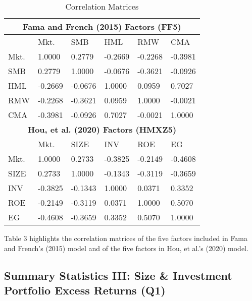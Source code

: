 \documentclass[11pt, english]{article}
\begin{document}
\begin{table}[h]
	\scriptsize
	\renewcommand{\arraystretch}{1.25}
\begin{center}                  
\begin{tabular}{ p{1.5cm} | p{1.5cm} p{1.5cm} p{1.5cm} p{1.5cm} p{1.5cm} }
        \hline
        \hline
        \multicolumn{6}{c}{\textbf{Fama and French (2015) Factors (FF5)}}\\
        \hline
        \hline
        & Mkt. & SMB & HML & RMW & CMA\\
        \hline
        Mkt. & 1.0000 & 0.2779 & -0.2669 & -0.2268 & -0.3981\\
        SMB & 0.2779 & 1.0000 & -0.0676 & -0.3621 & -0.0926\\
        HML & -0.2669 & -0.0676 & 1.0000 & 0.0959 & 0.7027\\
        RMW & -0.2268 & -0.3621 & 0.0959 & 1.0000 & -0.0021\\
        CMA & -0.3981 & -0.0926 & 0.7027 & -0.0021 & 1.0000\\
        \hline
        \hline
        \multicolumn{6}{c}{\textbf{Hou, et al. (2020) Factors (HMXZ5)}}\\
        \hline
        \hline
        & Mkt. & SIZE & INV & ROE & EG\\
        \hline
        Mkt. & 1.0000 & 0.2733 & -0.3825 & -0.2149 & -0.4608\\
        SIZE & 0.2733 & 1.0000 & -0.1343 & -0.3119 & -0.3659\\
        INV & -0.3825 & -0.1343 & 1.0000 & 0.0371 & 0.3352\\
        ROE & -0.2149 & -0.3119 & 0.0371 & 1.0000 & 0.5070\\
        EG & -0.4608 & -0.3659 & 0.3352 & 0.5070 & 1.0000\\
        \hline
\end{tabular}
        \caption{Correlation Matrices}
\end{center}
\end{table}

Table 3 highlights the correlation matrices of the five factors included in Fama and French's (2015) model and of the five factors in Hou, et al.'s (2020) model.

\newpage 

	\subsection{Summary Statistics III: Size \& Investment Portfolio Excess Returns (Q1)}
\end{document}

